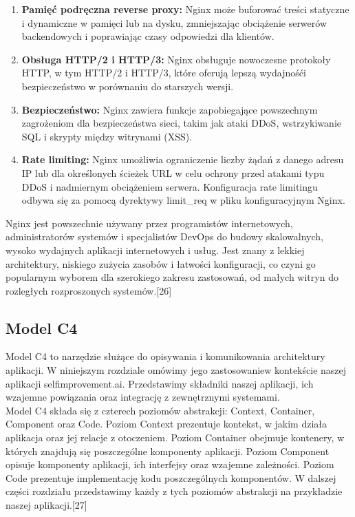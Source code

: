 \begin{enumerate}
\item {\bf Pamięć podręczna reverse proxy:}
Nginx może buforować treści statyczne i dynamiczne w pamięci lub na dysku, zmniejszając obciążenie serwerów backendowych i poprawiając czasy odpowiedzi dla klientów.

\item {\bf Obsługa HTTP/2 i HTTP/3:}
Nginx obsługuje nowoczesne protokoły HTTP, w tym HTTP/2 i HTTP/3, które oferują lepszą wydajność\linebreak i bezpieczeństwo w porównaniu do starszych wersji.

\item {\bf Bezpieczeństwo:}
Nginx zawiera funkcje zapobiegające powszechnym zagrożeniom dla bezpieczeństwa sieci, takim jak ataki DDoS, wstrzykiwanie SQL i skrypty między witrynami (XSS).

\item {\bf Rate limiting:}
Nginx umożliwia ograniczenie liczby żądań z danego adresu IP lub dla określonych ścieżek URL w celu ochrony przed atakami typu DDoS i nadmiernym obciążeniem serwera. Konfiguracja rate limitingu odbywa się za pomocą dyrektywy limit\_req w pliku konfiguracyjnym Nginx.

\end{enumerate}

Nginx jest powszechnie używany przez programistów internetowych, administratorów systemów i specjalistów DevOps do budowy skalowalnych, wysoko wydajnych aplikacji internetowych i usług. Jest znany z lekkiej architektury, niskiego zużycia zasobów i łatwości konfiguracji, co czyni go popularnym wyborem dla szerokiego zakresu zastosowań, od małych witryn do rozległych rozproszonych systemów.[26]

\subsection{Model C4}
Model C4 to narzędzie służące do opisywania i komunikowania architektury aplikacji. W niniejszym rozdziale omówimy jego zastosowanie\linebreak w kontekście naszej aplikacji selfimprovement.ai. Przedstawimy składniki naszej aplikacji, ich wzajemne powiązania oraz integrację z zewnętrznymi systemami.\\

Model C4 składa się z czterech poziomów abstrakcji: Context, Container, Component oraz Code. Poziom Context prezentuje kontekst, w jakim działa aplikacja oraz jej relacje z otoczeniem. Poziom Container obejmuje kontenery, w których znajdują się poszczególne komponenty aplikacji. Poziom Component opisuje komponenty aplikacji, ich interfejsy oraz wzajemne zależności. Poziom Code prezentuje implementację kodu poszczególnych komponentów. W dalszej części rozdziału przedstawimy każdy z tych poziomów abstrakcji na przykładzie naszej aplikacji.[27]

